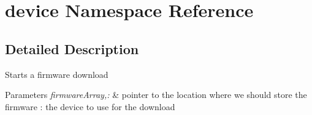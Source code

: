 \hypertarget{namespacedevice}{\section{device \-Namespace \-Reference}
\label{namespacedevice}
}


\subsection{\-Detailed \-Description}
\-Starts a firmware download 
\begin{DoxyParams}{\-Parameters}
{\em firmware\-Array,\-:} & pointer to the location where we should store the firmware \-: the device to use for the download \\
\hline
\end{DoxyParams}
